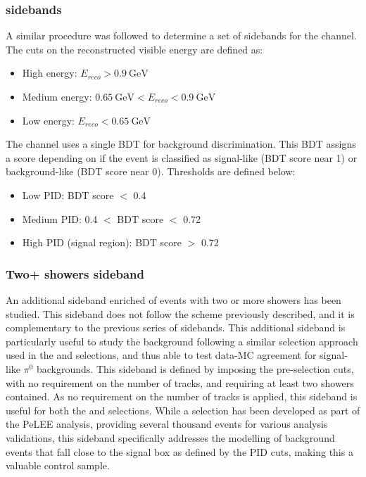 \subsubsection{\zpsel sidebands}
A similar procedure was followed to determine a set of sidebands for the \zpsel channel. The cuts on the reconstructed visible energy are defined as:

\begin{itemize}
    \item High energy: $E_{reco} > 0.9 ~\text{GeV}$
    \item Medium energy: $0.65 ~\text{GeV} < E_{reco} < 0.9 ~\text{GeV}$
    \item Low energy: $E_{reco} < 0.65 ~\text{GeV}$
\end{itemize}

The \zpsel channel uses a single BDT for background discrimination. This BDT assigns a score depending on if the event is classified as signal-like (BDT score near 1) or background-like (BDT score near 0). Thresholds are defined below:

\begin{itemize}
    \item Low PID: BDT score $<$ 0.4
    \item Medium PID: 0.4 $<$ BDT score $<$ 0.72
    \item High PID (signal region): BDT score $>$ 0.72
\end{itemize}

\subsubsection{Two+ showers sideband}
An additional sideband enriched of events with two or more showers has been studied.
This sideband does not follow the scheme previously described, and it is complementary to the previous series of sidebands.
This additional sideband is particularly useful to study the \pizero background following a similar selection approach used in the \npsel and \zpsel selections, and thus able to test data-MC agreement for signal-like $\pi^0$ backgrounds.
This sideband is defined by imposing the \nue pre-selection cuts, with no requirement on the number of tracks, and requiring at least two showers contained.
As no requirement on the number of tracks is applied, this sideband is useful for both the \nueccnopinp and \nueccnopinop selections.
While a \pizero selection has been developed as part of the PeLEE analysis, providing several thousand \pizero events for various analysis validations, this sideband specifically addresses the modelling of background events that fall close to the signal box as defined by the PID cuts, making this a valuable control sample.


